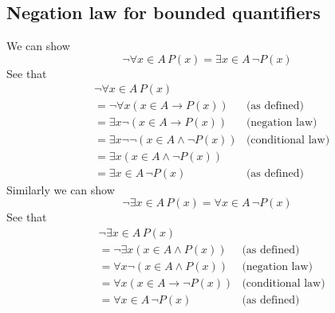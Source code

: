 \documentclass{report}
\theoremstyle{definition}
\begin{document}
\subsection{Negation law for bounded quantifiers}
We can show
\begin{equation*}
\neg\forall x\in A\,P(x)=\exists x\in A\,\neg P(x)
\end{equation*}
See that
\begin{align*}
&\neg\forall x\in A\,P(x)&\\
&=\neg\forall x(x\in A\to P(x))&\text{(as defined)}\\
&=\exists x\neg(x\in A\to P(x))&\text{(negation law)}\\
&=\exists x\neg\neg(x\in A\land\neg P(x))&\text{(conditional law)}\\
&=\exists x(x\in A\land\neg P(x))&\\
&=\exists x\in A\,\neg P(x)&\text{(as defined)}
\end{align*}
Similarly we can show
\begin{equation*}
\neg\exists x\in A\,P(x)=\forall x\in A\,\neg P(x)
\end{equation*}
See that
\begin{align*}
&\neg\exists x\in A\,P(x)&\\
&=\neg\exists x(x\in A\land P(x))&\text{(as defined)}\\
&=\forall x\neg(x\in A\land P(x))&\text{(negation law)}\\
&=\forall x(x\in A\to\neg P(x))&\text{(conditional law)}\\
&=\forall x\in A\,\neg P(x)&\text{(as defined)}
\end{align*}
\newpage
\end{document}
